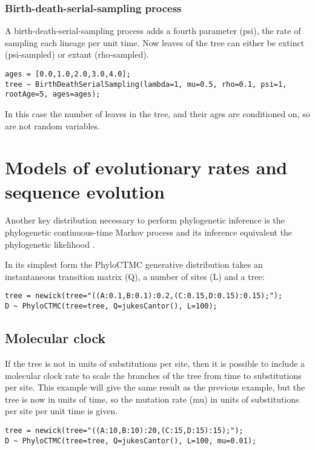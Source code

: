 \documentclass[oneside]{article}
\begin{document}
\subsubsection{Birth-death-serial-sampling process}

A birth-death-serial-sampling \cite{stadler2013dating} process adds a fourth parameter (psi), the rate of sampling each lineage per unit time.
Now leaves of the tree can either be extinct (psi-sampled) or extant (rho-sampled).

\begin{verbatim}
ages = [0.0,1.0,2.0,3.0,4.0];
tree ~ BirthDeathSerialSampling(lambda=1, mu=0.5, rho=0.1, psi=1, rootAge=5, ages=ages);
\end{verbatim}

In this case the number of leaves in the tree, and their ages are conditioned on, so are not random variables.

\section{Models of evolutionary rates and sequence evolution}

Another key distribution necessary to perform phylogenetic inference
is the phylogenetic continuous-time Markov process and its inference
equivalent the phylogenetic likelihood \cite{felsenstein1981}.

In its simplest form the PhyloCTMC generative
distribution takes an instantaneous transition matrix (Q), a number of sites (L) and a tree:

\begin{verbatim}
tree = newick(tree="((A:0.1,B:0.1):0.2,(C:0.15,D:0.15):0.15);");
D ~ PhyloCTMC(tree=tree, Q=jukesCantor(), L=100);
\end{verbatim}

\subsection{ Molecular clock}

If the tree is not in units of substitutions per site, then it is possible to include a molecular clock rate
to scale the branches of the tree from time to substitutions per site. This example will give the same
result as the previous example, but the tree is now in units of time, so the mutation rate (mu) in units of
substitutions per site per unit time is given.

\begin{verbatim}
tree = newick(tree="((A:10,B:10):20,(C:15,D:15):15);");
D ~ PhyloCTMC(tree=tree, Q=jukesCantor(), L=100, mu=0.01);
\end{verbatim}
\end{document}
